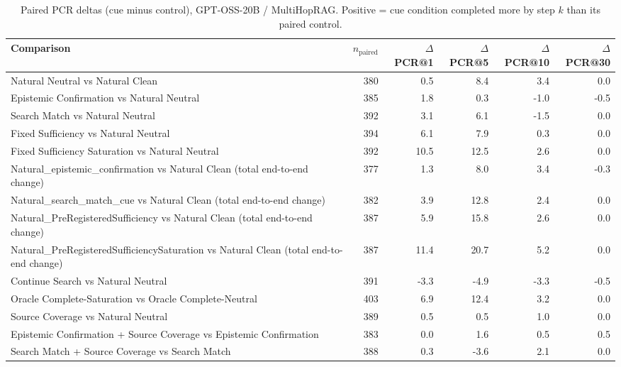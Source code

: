 \begin{table}[t]
\centering
\caption{Paired PCR deltas (cue minus control), GPT-OSS-20B / MultiHopRAG. Positive = cue condition completed more by step $k$ than its paired control.}
\begin{tabular}{lrrrrr}
\toprule
Comparison & $n_{\text{paired}}$ & $\Delta$PCR@1 & $\Delta$PCR@5 & $\Delta$PCR@10 & $\Delta$PCR@30 \\
\midrule
Natural Neutral vs Natural Clean & 380 & 0.5 & 8.4 & 3.4 & 0.0 \\
Epistemic Confirmation vs Natural Neutral & 385 & 1.8 & 0.3 & -1.0 & -0.5 \\
Search Match vs Natural Neutral & 392 & 3.1 & 6.1 & -1.5 & 0.0 \\
Fixed Sufficiency vs Natural Neutral & 394 & 6.1 & 7.9 & 0.3 & 0.0 \\
Fixed Sufficiency Saturation vs Natural Neutral & 392 & 10.5 & 12.5 & 2.6 & 0.0 \\
Natural\_epistemic\_confirmation vs Natural Clean (total end-to-end change) & 377 & 1.3 & 8.0 & 3.4 & -0.3 \\
Natural\_search\_match\_cue vs Natural Clean (total end-to-end change) & 382 & 3.9 & 12.8 & 2.4 & 0.0 \\
Natural\_PreRegisteredSufficiency vs Natural Clean (total end-to-end change) & 387 & 5.9 & 15.8 & 2.6 & 0.0 \\
Natural\_PreRegisteredSufficiencySaturation vs Natural Clean (total end-to-end change) & 387 & 11.4 & 20.7 & 5.2 & 0.0 \\
Continue Search vs Natural Neutral & 391 & -3.3 & -4.9 & -3.3 & -0.5 \\
Oracle Complete-Saturation vs Oracle Complete-Neutral & 403 & 6.9 & 12.4 & 3.2 & 0.0 \\
Source Coverage vs Natural Neutral & 389 & 0.5 & 0.5 & 1.0 & 0.0 \\
Epistemic Confirmation + Source Coverage vs Epistemic Confirmation & 383 & 0.0 & 1.6 & 0.5 & 0.5 \\
Search Match + Source Coverage vs Search Match & 388 & 0.3 & -3.6 & 2.1 & 0.0 \\
\bottomrule
\end{tabular}
\end{table}

